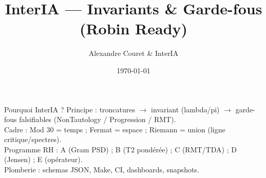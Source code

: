 \documentclass[aspectratio=169]{beamer}
\title{InterIA --- Invariants \& Garde-fous (Robin Ready)}
\author{Alexandre Couret \& InterIA}
\date{\today}
\begin{document}
\begin{frame}{Pourquoi InterIA ?}
\small
Principe : troncatures $\to$ invariant (lambda/pi) $\to$ garde-fous falsifiables (NonTautology / Progression / RMT).\\
Cadre : Mod 30 = temps ; Fermat = espace ; Riemann = union (ligne critique/spectres).\\
Programme RH : A (Gram PSD) ; B (T2 pond\'er\'ee) ; C (RMT/TDA) ; D (Jensen) ; E (op\'erateur).\\
Plomberie : schemas JSON, Make, CI, dashboards, snapshots.
\end{frame}
\end{document}
